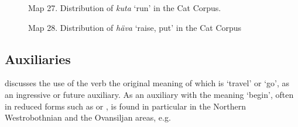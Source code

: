 

\begin{figure}[h]

\begin{minipage}{4.125in}

\label{bkm:Ref224380018}Map 27. Distribution of \textit{kuta}\textit{ }‘run’ in the Cat Corpus.


\end{minipage}

\end{figure}



\begin{figure}[h]

\begin{minipage}{6.71042in}

Map 28. Distribution of \textit{häva} ‘raise, put’ in the Cat Corpus


\end{minipage}

\end{figure}

\subsection{Auxiliaries}

\citet{Holm1941} discusses the use of the verb the original meaning of which is ‘travel’ or ‘go’, as an ingressive or future auxiliary. As an auxiliary with the meaning ‘begin’, often in reduced forms such as  or , is found in particular in the Northern Westrobothnian and the Ovansiljan areas, e.g. 


